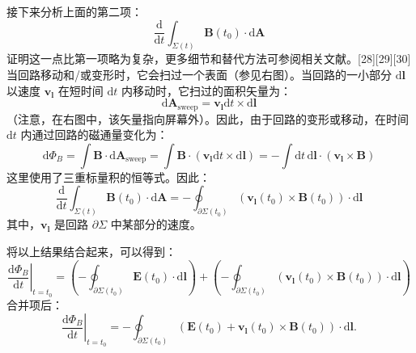 接下来分析上面的第二项：
\[
\frac{\mathrm{d}}{\mathrm{d} t} \int_{\Sigma(t)} \mathbf{B}(t_0) \cdot \mathrm{d} \mathbf{A}~
\]
证明这一点比第一项略为复杂，更多细节和替代方法可参阅相关文献。[28][29][30]  
当回路移动和/或变形时，它会扫过一个表面（参见右图）。当回路的一小部分 \( \mathrm{d}\mathbf{l} \) 以速度 \( \mathbf{v}_\mathbf{l} \) 在短时间 \( \mathrm{d}t \) 内移动时，它扫过的面积矢量为：
\[
\mathrm{d}\mathbf{A}_{\text{sweep}} = \mathbf{v}_\mathbf{l} \mathrm{d}t \times \mathrm{d}\mathbf{l}~
\]
（注意，在右图中，该矢量指向屏幕外）。因此，由于回路的变形或移动，在时间 \( \mathrm{d}t \) 内通过回路的磁通量变化为：
\[
\mathrm{d}\Phi_B = \int \mathbf{B} \cdot \mathrm{d}\mathbf{A}_{\text{sweep}} = \int \mathbf{B} \cdot (\mathbf{v}_\mathbf{l} \mathrm{d}t \times \mathrm{d}\mathbf{l}) = -\int \mathrm{d}t \, \mathrm{d}\mathbf{l} \cdot (\mathbf{v}_\mathbf{l} \times \mathbf{B})~
\]
这里使用了三重标量积的恒等式。因此：
\[
\frac{\mathrm{d}}{\mathrm{d}t} \int_{\Sigma(t)} \mathbf{B}(t_0) \cdot \mathrm{d}\mathbf{A} = -\oint_{\partial \Sigma(t_0)} (\mathbf{v}_\mathbf{l}(t_0) \times \mathbf{B}(t_0)) \cdot \mathrm{d}\mathbf{l}~
\]
其中，\( \mathbf{v}_\mathbf{l} \) 是回路 \(\partial \Sigma\) 中某部分的速度。

将以上结果结合起来，可以得到：
\[
\left. \frac{\mathrm{d}\Phi_B}{\mathrm{d}t} \right|_{t=t_0} = \left( -\oint_{\partial \Sigma(t_0)} \mathbf{E}(t_0) \cdot \mathrm{d}\mathbf{l} \right) + \left( -\oint_{\partial \Sigma(t_0)} (\mathbf{v}_\mathbf{l}(t_0) \times \mathbf{B}(t_0)) \cdot \mathrm{d}\mathbf{l} \right)~
\]
合并项后：
\[
\left. \frac{\mathrm{d}\Phi_B}{\mathrm{d}t} \right|_{t=t_0} = -\oint_{\partial \Sigma(t_0)} \left( \mathbf{E}(t_0) + \mathbf{v}_\mathbf{l}(t_0) \times \mathbf{B}(t_0) \right) \cdot \mathrm{d}\mathbf{l}.~
\]